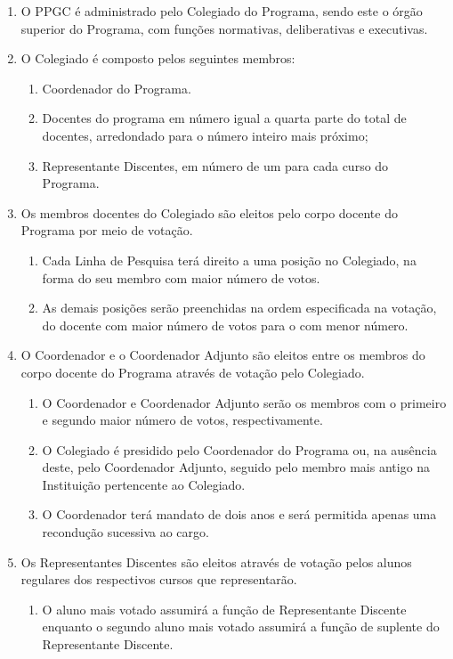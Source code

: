 \documentclass{article}
\newcommand{\singleitem}{\item[Parágrafo Único.]}
\begin{document}
\begin{enumerate}

	\item O PPGC é administrado pelo Colegiado do Programa, sendo este o órgão superior do Programa, com funções normativas, deliberativas e executivas.

	\item O Colegiado é composto pelos seguintes membros:
	\begin{enumerate}[label=\Roman*]
		\item Coordenador do Programa.
		\item Docentes do programa em número igual a quarta parte do total de docentes, arredondado para o número inteiro mais próximo;
		\item Representante Discentes, em número de um para cada curso do Programa.
	\end{enumerate}

	\item Os membros docentes do Colegiado são eleitos pelo corpo docente do Programa por meio de votação.
	\begin{enumerate}
		\item Cada Linha de Pesquisa terá direito a uma posição no Colegiado, na forma do seu membro com maior número de votos.
		\item As demais posições serão preenchidas na ordem especificada na votação, do docente com maior número de votos para o com menor número.
	\end{enumerate}

	\item O Coordenador e o Coordenador Adjunto são eleitos entre os membros do corpo docente do Programa através de votação pelo Colegiado. 
	\begin{enumerate}
		\item O Coordenador e Coordenador Adjunto serão os membros com o primeiro e segundo maior número de votos, respectivamente.
		\item O Colegiado é presidido pelo Coordenador do Programa ou, na ausência deste, pelo Coordenador Adjunto, seguido pelo membro mais antigo na Instituição pertencente ao Colegiado.
		\item O Coordenador terá mandato de dois anos e será permitida apenas uma recondução sucessiva ao cargo.
	\end{enumerate}

	\item Os Representantes Discentes são eleitos através de votação pelos alunos regulares dos respectivos cursos que representarão.
	\begin{enumerate}
		\singleitem O aluno mais votado assumirá a função de Representante Discente enquanto o segundo aluno mais votado assumirá a função de suplente do Representante Discente.
	\end{enumerate}	


\end{enumerate}
\end{document}
